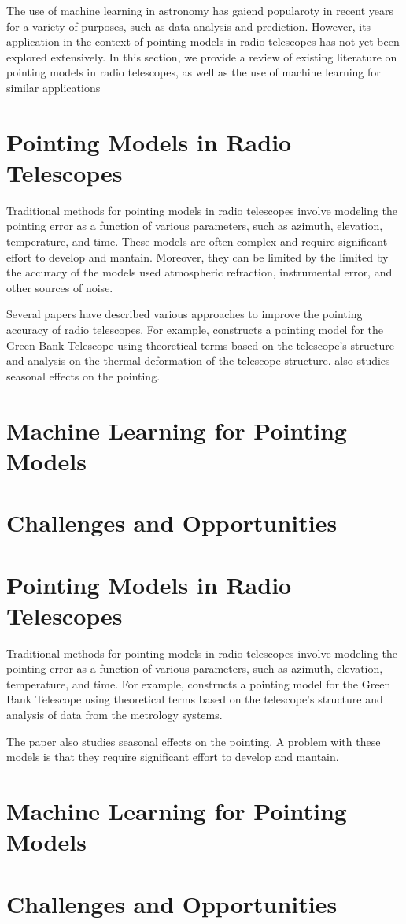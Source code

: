 The use of machine learning in astronomy has gaiend popularoty in recent years for a variety of purposes, such as data analysis and prediction.
However, its application in the context of pointing models in radio telescopes has not yet been explored extensively. 
In this section, we provide a review of existing literature on pointing models in radio telescopes, as well as the use of machine learning for similar applications

\section{Pointing Models in Radio Telescopes}
Traditional methods for pointing models in radio telescopes involve modeling the pointing error as a function of various parameters, 
such as azimuth, elevation, temperature, and time. 
These models are often complex and require significant effort to develop and mantain.
Moreover, they can be limited by the limited by the accuracy of the models used atmospheric refraction, instrumental error, and other sources of noise.

Several papers have described various approaches to improve the pointing accuracy of radio telescopes.
For example, \cite{white_green_2022} constructs a pointing model for the Green Bank Telescope
using theoretical terms based on the telescope's structure and analysis on the thermal deformation of the telescope structure.
\cite{greve1996pointing} also studies seasonal effects on the pointing.



\section{Machine Learning for Pointing Models}

\section{Challenges and Opportunities}




\section{Pointing Models in Radio Telescopes}
Traditional methods for pointing models in radio telescopes involve modeling the pointing error as a function of various parameters,
such as azimuth, elevation, temperature, and time.
For example, \cite{white_green_2022} constructs a pointing model for the Green Bank Telescope
using theoretical terms based on the telescope's structure and analysis of data from the metrology systems. 

The paper \cite{greve1996pointing} also studies seasonal effects on the pointing.
A problem with these models is that they require significant effort to develop and mantain.

\section{Machine Learning for Pointing Models}

\section{Challenges and Opportunities}

